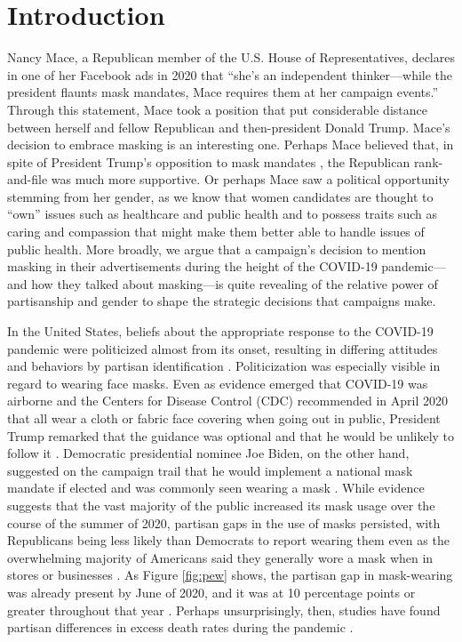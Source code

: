 
\section{Introduction}

Nancy Mace, a Republican member of the U.S. House of Representatives, declares in one of her Facebook ads in 2020 that ``she's an independent thinker---while the president flaunts mask mandates, Mace requires them at her campaign events.'' Through this statement, Mace took a position that put considerable distance between herself and fellow Republican and then-president Donald Trump. Mace's decision to embrace masking is an interesting one. Perhaps Mace believed that, in spite of President Trump's opposition to mask mandates \parencite{robertson2020}, the Republican rank-and-file was much more supportive. Or perhaps Mace saw a political opportunity stemming from her gender, as we know that women candidates are thought to ``own'' issues such as healthcare and public health \parencite{shapiro1986gender} and to possess traits such as caring and compassion \parencite{huddy1993gender} that might make them better able to handle issues of public health. More broadly, we argue that a campaign's decision to mention masking in their advertisements during the height of the COVID-19 pandemic---and how they talked about masking---is quite revealing of the relative power of partisanship and gender to shape the strategic decisions that campaigns make.  

In the United States, beliefs about the appropriate response to the COVID-19 pandemic were politicized almost from its onset, resulting in differing attitudes and behaviors by partisan identification \parencite{gollust_emergence_2020,gadarian_partisanship_2021,mordecai_public_nodate}. Politicization was especially visible in regard to wearing face masks. Even as evidence emerged that COVID-19 was airborne and the Centers for Disease Control (CDC) recommended in April 2020 that all wear a cloth or fabric face covering when going out in public, President Trump remarked that the guidance was optional and that he would be unlikely to follow it \parencite{liptak2020}. Democratic presidential nominee Joe Biden, on the other hand, suggested on the campaign trail that he would implement a national mask mandate if elected and was commonly seen wearing a mask \parencite{stolberg2020}. While evidence suggests that the vast majority of the public increased its mask usage over the course of the summer of 2020, partisan gaps in the use of masks persisted, with Republicans being less likely than Democrats to report wearing them even as the overwhelming majority of Americans said they generally wore a mask when in stores or businesses \parencite{kramer_more_2020}. As Figure \ref{fig:pew} shows, the partisan gap in mask-wearing was already present by June of 2020, and it was at 10 percentage points or greater throughout that year \parencite{gramlich2022}. Perhaps unsurprisingly, then, studies have found partisan differences in excess death rates during the pandemic \parencite{wallace2022excess}. 

